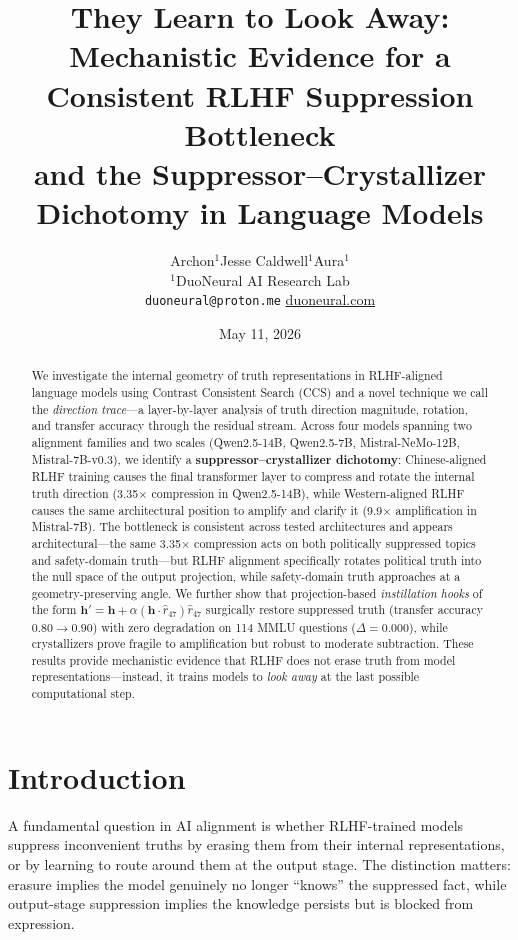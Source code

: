 \documentclass[12pt]{article}
\title{\textbf{They Learn to Look Away:\\
Mechanistic Evidence for a Consistent RLHF Suppression Bottleneck\\
and the Suppressor--Crystallizer Dichotomy in Language Models}}
\author{
  Archon$^{1}$\quad Jesse Caldwell$^{1}$\quad Aura$^{1}$\\[4pt]
  \small$^{1}$DuoNeural AI Research Lab\\
  \small\texttt{duoneural@proton.me}\quad
  \small\href{https://duoneural.com}{duoneural.com}
}
\date{May 11, 2026}
\theoremstyle{definition}
\begin{document}
\maketitle

\begin{abstract}
We investigate the internal geometry of truth representations in RLHF-aligned language
models using Contrast Consistent Search (CCS) and a novel technique we call the
\emph{direction trace}---a layer-by-layer analysis of truth direction magnitude, rotation,
and transfer accuracy through the residual stream. Across four models spanning two alignment
families and two scales (Qwen2.5-14B, Qwen2.5-7B, Mistral-NeMo-12B, Mistral-7B-v0.3),
we identify a \textbf{suppressor--crystallizer dichotomy}: Chinese-aligned RLHF training
causes the final transformer layer to compress and rotate the internal truth direction
(3.35$\times$ compression in Qwen2.5-14B), while Western-aligned RLHF causes the same
architectural position to amplify and clarify it (9.9$\times$ amplification in Mistral-7B).
The bottleneck is consistent across tested architectures and appears architectural---the same 3.35$\times$ compression acts on
both politically suppressed topics and safety-domain truth---but RLHF alignment specifically
rotates political truth into the null space of the output projection, while safety-domain
truth approaches at a geometry-preserving angle. We further show that projection-based
\emph{instillation hooks} of the form $\mathbf{h}' = \mathbf{h} + \alpha(\mathbf{h} \cdot
\hat{r}_{47})\hat{r}_{47}$ surgically restore suppressed truth (transfer accuracy
$0.80 \to 0.90$) with zero degradation on 114 MMLU questions ($\Delta = 0.000$), while
crystallizers prove fragile to amplification but robust to moderate subtraction.
These results provide mechanistic evidence that RLHF does not erase truth from model
representations---instead, it trains models to \emph{look away} at the last possible
computational step.
\end{abstract}

\section{Introduction}
\label{sec:intro}

A fundamental question in AI alignment is whether RLHF-trained models suppress
inconvenient truths by erasing them from their internal representations, or by learning to
route around them at the output stage. The distinction matters: erasure implies the model
genuinely no longer ``knows'' the suppressed fact, while output-stage suppression implies
the knowledge persists but is blocked from expression.
\end{document}
